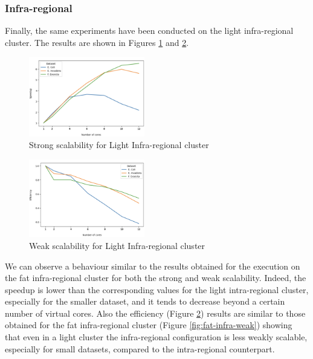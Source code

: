 \documentclass[final,5p,times,twocolumn,authoryear]{elsarticle}
\begin{document}
\subsubsection{Infra-regional}
Finally, the same experiments have been conducted on the light infra-regional cluster. The results are shown in Figures \ref{fig:light-infra-strong} and \ref{fig:light-infra-weak}. 
\begin{figure}[H]
    \centering
    \includegraphics[width=0.45\textwidth]{images/light_infra_strong.png}
    \caption{Strong scalability for Light Infra-regional cluster }
    \label{fig:light-infra-strong}
\end{figure}
\begin{figure}[H]
    \centering
    \includegraphics[width=0.45\textwidth]{images/light_infra_weak.png}
    \caption{Weak scalability for Light Infra-regional cluster }
    \label{fig:light-infra-weak}
\end{figure}
We can observe a behaviour similar to the results obtained for the execution on the fat infra-regional cluster for both the strong and weak scalability. Indeed, the speedup is lower than the corresponding values for the light intra-regional cluster, especially for the smaller dataset, and it tends to decrease beyond a certain number of virtual cores. Also the efficiency (Figure \ref{fig:light-infra-weak}) results are similar to those obtained for the fat infra-regional cluster (Figure \ref{fig:fat-infra-weak}) showing that even in a light cluster the infra-regional configuration is less weakly scalable, especially for small datasets, compared to the intra-regional counterpart. 
\end{document}
